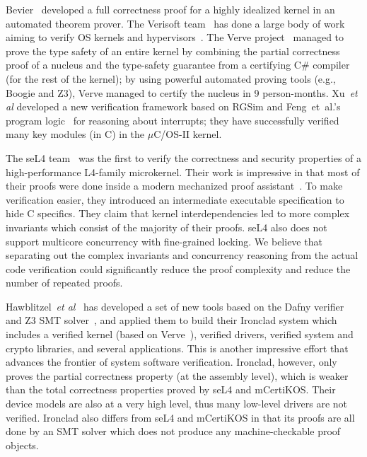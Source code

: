 Bevier~\cite{bevier89} developed a full correctness proof
for a highly idealized kernel in an automated theorem prover. The
Verisoft team~\cite{verisoft07} has done a large body of work aiming
to verify OS kernels and
hypervisors~\cite{leinenbach09,alkassar10}. The Verve
project~\cite{hawblitzel10} managed to prove the type safety of an
entire kernel by combining the partial correctness proof of a nucleus
and the type-safety guarantee from a certifying C\# compiler (for the
rest of the kernel); by using powerful automated proving tools (e.g.,
Boogie and Z3), Verve managed to certify the nucleus in 9
person-months.
Xu~{\em et al} \cite{xu16} developed a new verification framework based on RGSim
and Feng~{et~al.}'s program logic~\cite{feng08:aim} for reasoning
about interrupts; they have successfully verified many key modules
(in C) in the $\mu$C/OS-II kernel.

The seL4 team~\cite{klein2009sel4} was the first to verify the
correctness and security properties of a high-performance L4-family
microkernel. Their work is impressive in that most of their proofs
were done inside a modern mechanized proof
assistant~\cite{Paulson:Isabelle}.  To make verification easier, they
introduced an intermediate executable specification to hide C
specifics. They claim that kernel
interdependencies led to more complex invariants which consist
of the majority of their proofs. seL4 also does not support multicore
concurrency with fine-grained locking. 
We believe that separating out the complex invariants and concurrency
reasoning from the actual code verification could significantly reduce
the proof complexity and reduce the number of repeated proofs.

Hawblitzel~{\em et al}~\cite{ironclad14} has developed a set
of new tools based on the Dafny verifier~\cite{dafny10} and Z3 SMT
solver~\cite{moura08}, and applied them to build their Ironclad system
which includes a verified kernel (based on Verve~\cite{hawblitzel10}),
verified drivers, verified system and crypto libraries, and several
applications.  This is another impressive effort that advances the
frontier of system software verification. Ironclad, however, only
proves the partial correctness property (at the assembly level), which
is weaker than the total correctness properties proved by seL4 and
mCertiKOS. 
Their device models are also at a very high level, thus many low-level
drivers are not verified. Ironclad also differs
from seL4 and mCertiKOS in that its proofs are all done by an SMT solver
which does not produce any machine-checkable proof objects.

